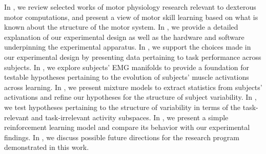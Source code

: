 \documentclass[../main.tex]{subfiles}
\begin{document}
In , we review selected works of motor physiology research relevant to dexterous motor computations, and present a view of motor skill learning based on what is known about the structure of the motor system. In , we provide a detailed explanation of our experimental design as well as the hardware and software underpinning the experimental apparatus. In , we support the choices made in our experimental design by presenting data pertaining to task performance across subjects. In , we explore subjects' EMG manifolds to provide a foundation for testable hypotheses pertaining to the evolution of subjects' muscle activations across learning. In , we present mixture models to extract statistics from subjects' activations and refine our hypotheses for the structure of subject variability. In , we test hypotheses pertaining to the structure of variability in terms of the task-relevant and task-irrelevant activity subspaces. In , we present a simple reinforcement learning model and compare its behavior with our experimental findings. In , we discuss possible future directions for the research program demonstrated in this work.


\cleardoublepage\printendnotes%
\ifSubfilesClassLoaded{%
    \newpage%
}{}%
\end{document}
